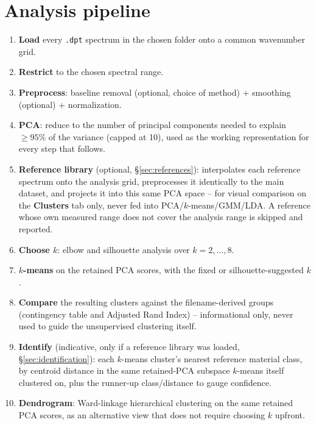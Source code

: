 \documentclass[11pt,a4paper]{article}
\newcommand{\code}[1]{\texttt{#1}}
\begin{document}
\section{Analysis pipeline}
\label{sec:pipeline}
\begin{enumerate}
  \item \textbf{Load} every \code{.dpt} spectrum in the chosen folder onto a
  common wavenumber grid.
  \item \textbf{Restrict} to the chosen spectral range.
  \item \textbf{Preprocess}: baseline removal (optional, choice of method) +
  smoothing (optional) + normalization.
  \item \textbf{PCA}: reduce to the number of principal components needed to
  explain $\geq 95\%$ of the variance (capped at 10), used as the working
  representation for every step that follows.
  \item \textbf{Reference library} (optional, \S\ref{sec:references}):
  interpolates each reference spectrum onto the analysis grid, preprocesses
  it identically to the main dataset, and projects it into this same PCA
  space -- for visual comparison on the \textbf{Clusters} tab only, never
  fed into PCA/$k$-means/GMM/LDA. A reference whose own measured range does
  not cover the analysis range is skipped and reported.
  \item \textbf{Choose $k$}: elbow and silhouette analysis over
  $k = 2,\dots,8$.
  \item \textbf{$k$-means} on the retained PCA scores, with the fixed or
  silhouette-suggested $k$.
  \item \textbf{Compare} the resulting clusters against the filename-derived
  groups (contingency table and Adjusted Rand Index) -- informational only,
  never used to guide the unsupervised clustering itself.
  \item \textbf{Identify} (indicative, only if a reference library was
  loaded, \S\ref{sec:identification}): each $k$-means cluster's nearest
  reference material class, by centroid distance in the same retained-PCA
  subspace $k$-means itself clustered on, plus the runner-up class/distance
  to gauge confidence.
  \item \textbf{Dendrogram}: Ward-linkage hierarchical clustering on the same
  retained PCA scores, as an alternative view that does not require choosing
  $k$ upfront.

\end{enumerate}
\end{document}
